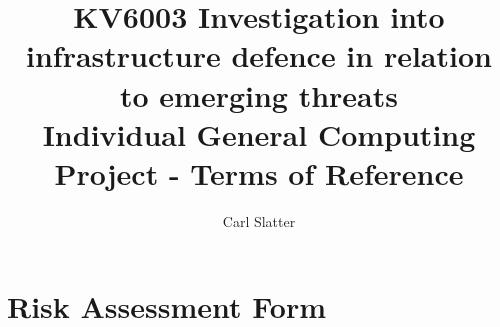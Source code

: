 \documentclass[12pt,a4paper]{article}
\title{ 
    KV6003 Investigation into infrastructure defence in relation to emerging threats  \\
    \large Individual General Computing Project - Terms of Reference\\
}
\author{Carl Slatter}
\begin{document}
\maketitle


 



\section{Risk Assessment Form}

\end{document}

